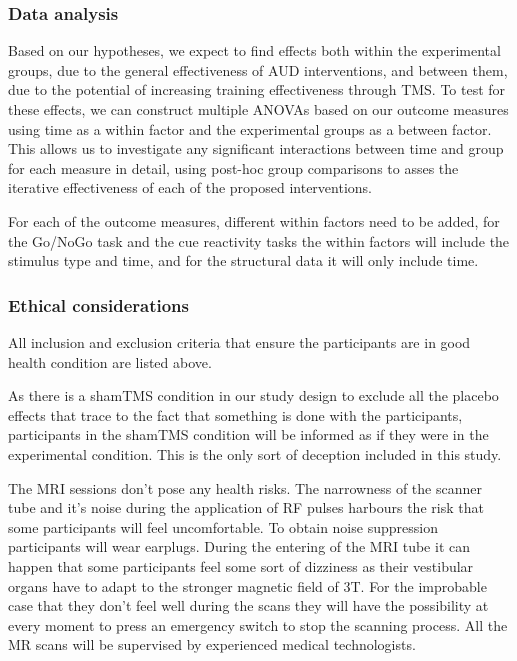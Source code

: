\documentclass[12pt]{article}
\begin{document}
\subsubsection{Data analysis}

Based on our hypotheses, we expect to find effects both within the experimental groups, due to the general effectiveness of AUD interventions, and between them, due to the potential of increasing training effectiveness through TMS. To test for these effects, we can construct multiple ANOVAs based on our outcome measures using time as a within factor and the experimental groups as a between factor. This allows us to investigate any significant interactions between time and group for each measure in detail, using post-hoc group comparisons to asses the iterative effectiveness of each of the proposed interventions.

For each of the outcome measures, different within factors need to be added, for the Go/NoGo task and the cue reactivity tasks the within factors will include the stimulus type and time, and for the structural data it will only include time.

\subsubsection{Ethical considerations}
All inclusion and exclusion criteria that ensure the participants are in good health condition are listed above.

As there is a shamTMS condition in our study design to exclude all the placebo effects that trace to the fact that something is done with the participants, participants in the shamTMS condition will be informed as if they were in the experimental condition. This is the only sort of deception included in this study. 

The MRI sessions don't pose any health risks. The narrowness of the scanner tube and it's noise during the application of RF pulses harbours the risk that some participants will feel uncomfortable. To obtain noise suppression participants will wear earplugs. During the entering of the MRI tube it can happen that some participants feel some sort of dizziness as their vestibular organs have to adapt to the stronger magnetic field of 3T. For the improbable case that they don't feel well during the scans they will have the possibility at every moment to press an emergency switch to stop the scanning process. All the MR scans will be supervised by experienced medical technologists. 
\end{document}
